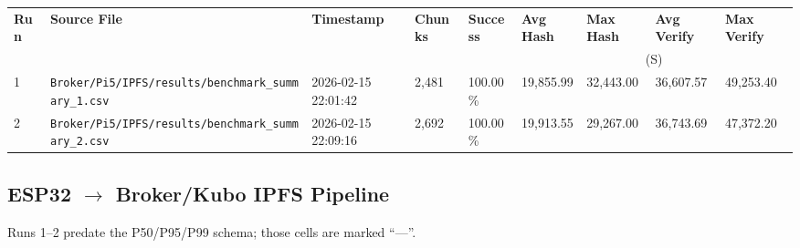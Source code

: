 \documentclass[11pt,letterpaper]{article}
\newcommand{\us}{\textmu{}S}   %
\newcommand{\code}[1]{\texttt{#1}}
\newcommand{\dash}{---}
\begin{document}
\begin{adjustbox}{max width=\linewidth}
\begin{tabular}{@{}R{0.6cm}L{7.5cm}L{3.5cm}R{1.5cm}R{1.5cm}R{1.8cm}R{1.8cm}R{1.8cm}R{1.8cm}@{}}
\toprule
\textbf{Run} & \textbf{Source File} & \textbf{Timestamp} &
\textbf{Chunks} & \textbf{Success} &
\textbf{Avg Hash} & \textbf{Max Hash} & \textbf{Avg Verify} & \textbf{Max Verify} \\
 & & & & & \multicolumn{4}{c}{(\us)} \\
 & \code{Broker/Pi5/IPFS/results/benchmark\_summary\_1.csv} & 2026-02-15 22:01:42 &
  2,481 & 100.00\% & 19,855.99 & 32,443.00 & 36,607.57 & 49,253.40 \\
2 & \code{Broker/Pi5/IPFS/results/benchmark\_summary\_2.csv} & 2026-02-15 22:09:16 &
  2,692 & 100.00\% & 19,913.55 & 29,267.00 & 36,743.69 & 47,372.20 \\
\bottomrule
\end{tabular}
\end{adjustbox}

\subsection{ESP32 \texorpdfstring{$\rightarrow$}{->} Broker/Kubo IPFS Pipeline}

Runs 1--2 predate the P50/P95/P99 schema; those cells are marked ``\dash''.
\end{document}
